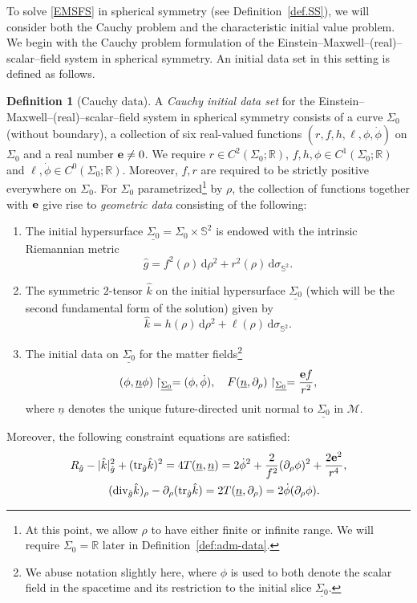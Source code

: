 \documentclass[10pt, reqno]{amsart}
\theoremstyle{definition}
\newtheorem{definition}[theorem]{Definition}
\theoremstyle{remark}
\theoremstyle{conjecture}
\numberwithin{equation}{section}
\newcommand{\ud}{\mathrm{d}}
\newcommand{\rd}{\partial}
\newcommand{\0}{\emptyset}
\newcommand{\sgm}{\sigma}
\newcommand{\Sgm}{\Sigma}
\newcommand{\bbS}{\mathbb S}
\newcommand{\f}{\frac}
\begin{document}
To solve \eqref{EMSFS} in spherical symmetry (see Definition~\ref{def.SS}), we will consider both the Cauchy problem and the characteristic initial value problem. We begin with the Cauchy problem formulation of the Einstein--Maxwell--(real)--scalar--field system in spherical symmetry. An initial data set in this setting is defined as follows.
\begin{definition}[Cauchy data]\label{def.Cauchy.data}
A \emph{Cauchy initial data set} for the Einstein--Maxwell--(real)--scalar--field system in spherical symmetry consists of a curve $\Sgm_{0}$ (without boundary), a collection of six real-valued functions $(r, f, h, \ell, \phi, \dot{\phi})$ on $\Sgm_{0}$ and a real number ${\bf e}\neq 0$. We require $r\in C^2(\Sgm_0;\mathbb R)$, $f,h,\phi\in C^1(\Sgm_0;\mathbb R)$ and $\ell,\dot{\phi}\in C^0(\Sgm_0;\mathbb R)$. Moreover, $f, r$ are required to be strictly positive everywhere on $\Sgm_0$. For $\Sgm_0$ parametrized\footnote{At this point, we allow $\rho$ to have either finite or infinite range. We will require $\Sgm_0 =\mathbb R$ later in Definition~\ref{def:adm-data}.} by $\rho$, the collection of functions together with ${\bf e}$ give rise to \emph{geometric data} consisting of the following:

\begin{enumerate}
\item The initial hypersurface $\underline{\Sgm_{0}} = \Sgm_{0} \times \bbS^{2}$ is endowed with the intrinsic Riemannian metric
\begin{equation*}
\hat{g} = f^{2}(\rho) \, \ud \rho^2+ r^{2}(\rho) \, \ud \sgm_{\bbS^{2}}.
\end{equation*}

\item The symmetric $2$-tensor $\hat{k}$ on the initial hypersurface $\underline{\Sgm_{0}}$ (which will be the second fundamental form of the solution) given by
\begin{equation*}
	\hat{k} = h(\rho) \, \ud \rho^{2} + \ell(\rho) \, \ud \sgm_{\bbS^{2}}.
\end{equation*}

\item The initial data on $\underline{\Sgm_{0}}$ for the matter fields\footnote{We abuse notation slightly here, where $\phi$ is used to both denote the scalar field in the spacetime and its restriction to the initial slice $\underline{\Sgm_{0}}$.}
$$(\phi, \underline{n} \phi)\restriction_{\underline{\Sgm_{0}}}=(\phi, \dot{\phi}),\quad F(\underline{n}, \rd_\rho)\restriction_{\underline{\Sgm_{0}}}=\f{{\bf e}f}{r^2},$$
where $\underline{n}$ denotes the unique future-directed unit normal to $\underline{\Sgm_0}$ in $\mathcal M$.
\end{enumerate}
Moreover, the following constraint equations are satisfied: 
\begin{gather}
R_{\hat{g}}-|\hat{k}|^2_{\hat{g}}+(\mbox{tr}_{\hat{g}}\hat{k})^2=4T(\underline{n}, \underline{n})=2\dot{\phi}^2+\f{2}{f^2}(\rd_\rho\phi)^2+\f{2{\bf e}^2}{r^4},\label{ham.con}\\
\quad(\mbox{div}_{\hat{g}} \hat{k})_\rho-\rd_{\rho}(\mbox{tr}_{\hat{g}} \hat{k})=2T(\underline{n}, \rd_\rho)=2\dot{\phi}(\rd_{\rho}\phi).\label{mom.con}
\end{gather}


\end{definition}
\end{document}
